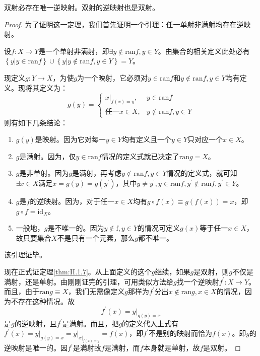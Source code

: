 \documentclass[../main.tex]{subfiles}
\begin{document}
\begin{theorem}\label{thm:II.1.7}
    双射必存在唯一逆映射。双射的逆映射也是双射。
\end{theorem}
\begin{proof}
    为了证明这一定理，我们首先证明一个引理：任一单射非满射均存在逆映射。

    设$f:X\rightarrow Y$是一个单射非满射，即$\exists y\notin\mathrm{ran}f,y\in Y$。由集合的相关定义此处必有$\left\{y|y\in\mathrm{ran}f\right\}\cup\left\{y|y\notin\mathrm{ran}f,y\in Y\right\}=Y$。

    现定义$g:Y\rightarrow X$，为使$g$为一个映射，它必须对$y\in\mathrm{ran}f$和$y\notin\mathrm{ran}f,y\in Y$均有定义。现将其定义为：
    \[
        g\left(y\right)=\left\{
        \begin{array}{ll}
            \left.x\right|_{f\left(x\right)=y}, & y\in\mathrm{ran}f           \\
            \text{任一}x\in X,                    & y\notin\mathrm{ran}f,y\in Y
        \end{array}
        \right.
    \]
    则有如下几条结论：
    \begin{enumerate}
        \item $g\left(y\right)$是映射。因为它对每一$y\in Y$均有定义且一个$y\in Y$只对应一个$x\in X$。
        \item $g$是满射。因为，仅$y\in\mathrm{ran}f$情况的定义式就已决定了$\mathrm{ran}g=X$。
        \item $g$是非单射。因为$g$是满射，再考虑$y\notin\mathrm{ran}f,y\in Y$情况的定义式，就可知$\exists x\in X$满足$x=g\left(y\right)=g\left(y^\prime\right)$，其中$y\neq y^\prime,y\in\mathrm{ran}f,y^\prime\notin\mathrm{ran}f,y^\prime\in Y$。
        \item $g$是$f$的逆映射。因为，对于任一$x\in X$均有$g\circ f\left(x\right)\equiv g\left(f\left(x\right)\right)=x$，即$g\circ f=\mathrm{id}_X$。
        \item 一般地，$g$是不唯一的。因为$y\notin\mathrm{f},y\in Y$的情况可定义$g\left(x\right)$等于任一$x\in X$，故只要集合$X$不是只有一个元素，那么$g$都不唯一。
    \end{enumerate}
    该引理证毕。

    现在正式证定理\ref{thm:II.1.7}。从上面定义的这个$g$继续，如果$g$是双射，则$g$不仅是满射，还是单射。由刚刚证完的引理，可用类似方法给$g$找一个逆映射$f^\prime:X\rightarrow Y$。而且，由于$\mathrm{ran}g\equiv X$，我们无需像定义$g$那样为$f^\prime$分出$x\notin\mathrm{ran}g,x\in X$的情况，因为不存在这种情况。故
    \[
        f^\prime\left(x\right)=\left.y\right|_{g\left(y\right)=x}
    \]
    是$g$的逆映射，且$f^\prime$是满射。而且，把$g$的定义代入上式有$f^\prime\left(x\right)=\left.y\right|_{g\left(y\right)=x}=\left.y\right|_{\left.x\right|_{f\left(x\right)=y}}=f\left(x\right)$，即$f^\prime$不是别的映射而恰为$f\left(x\right)$。即$g$的逆映射是唯一的。因$f^\prime$是满射故$f$是满射，而$f$本身就是单射，故$f$是双射。
\end{proof}
\end{document}
